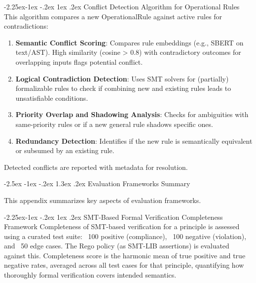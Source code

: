 \documentclass[manuscript,screen,9pt]{acmart}
\makeatletter
\renewcommand\section{\@startsection{section}{1}{\z@}%
  {-2.5ex \@plus -1ex \@minus -.2ex}%
  {1.3ex \@plus.2ex}%
  {\normalfont\Large\bfseries}}
\renewcommand\subsection{\@startsection{subsection}{2}{\z@}%
  {-2.25ex\@plus -1ex \@minus -.2ex}%
  {1ex \@plus .2ex}%
  {\normalfont\large\bfseries}}
\makeatother
\begin{document}
\begin{table}[!htb]
\subsection{Conflict Detection Algorithm for Operational Rules}
This algorithm compares a new OperationalRule against active rules for contradictions:
\begin{enumerate}[leftmargin=*,itemsep=1pt,parsep=1pt]
    \item \textbf{Semantic Conflict Scoring}: Compares rule embeddings (e.g., SBERT on text/AST). High similarity (cosine > 0.8) with contradictory outcomes for overlapping inputs flags potential conflict.
    \item \textbf{Logical Contradiction Detection}: Uses SMT solvers for (partially) formalizable rules to check if combining new and existing rules leads to unsatisfiable conditions.
    \item \textbf{Priority Overlap and Shadowing Analysis}: Checks for ambiguities with same-priority rules or if a new general rule shadows specific ones.
    \item \textbf{Redundancy Detection}: Identifies if the new rule is semantically equivalent or subsumed by an existing rule.
\end{enumerate}
Detected conflicts are reported with metadata for resolution.

\section{Evaluation Frameworks Summary}
\label{app:evaluation}

This appendix summarizes key aspects of evaluation frameworks.

\subsection{SMT-Based Formal Verification Completeness Framework}
Completeness of SMT-based verification for a principle is assessed using a curated test suite: ~100 positive (compliance), ~100 negative (violation), and ~50 edge cases. The Rego policy (as SMT-LIB assertions) is evaluated against this. Completeness score is the harmonic mean of true positive and true negative rates, averaged across all test cases for that principle, quantifying how thoroughly formal verification covers intended semantics.


\end{table}
\end{document}
